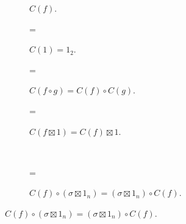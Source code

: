 \begin{figure}[t]
    \begin{subfigure}[b]{0.14\textwidth}
        \centering
        \caption{$C( f )$.}
        \label{Fig:ControlDefn:Notation}
    \end{subfigure}
    \begin{subfigure}[b]{0.20\textwidth}
        \centering
        =
        \caption{$C( 1 ) = 1_2$.}
        \label{Fig:ControlDefn:Units}
    \end{subfigure}
    \begin{subfigure}[b]{0.37\textwidth}
        \centering
        =
        \vspace{-0.5em}
        \caption{$C( f \circ g ) = C( f ) \circ C( g )$.}
        \label{Fig:ControlDefn:Composition}
    \end{subfigure}
    \begin{subfigure}[b]{0.26\textwidth}
        \centering
        =
        \vspace{-0.5em}
        \caption{$C( f \boxtimes 1 ) = C( f ) \boxtimes 1$.}
        \label{Fig:ControlDefn:IdTensor}
    \end{subfigure}
    \\
    \begin{subfigure}[b]{0.43\textwidth}
        \centering
        =
        \vspace{0.3em}
        \caption{$C( f ) \circ ( \sigma \boxtimes 1_n ) = ( \sigma \boxtimes 1_n ) \circ C( f )$.}
        \label{Fig:ControlDefn:ContrlSym}
    \end{subfigure}

\end{figure}
